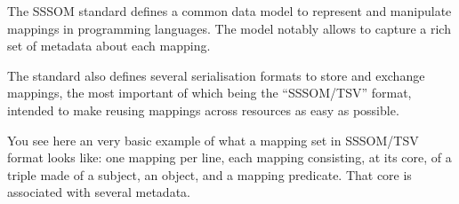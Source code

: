 \begin{frame}
{  The SSSOM standard defines a common data model to represent and manipulate
  mappings in programming languages. The model notably allows to capture a
  rich set of metadata about each mapping.

  The standard also defines several serialisation formats to store and
  exchange mappings, the most important of which being the ``SSSOM/TSV''
  format, intended to make reusing mappings across resources as easy as
  possible.

  You see here an very basic example of what a mapping set in SSSOM/TSV format
  looks like: one mapping per line, each mapping consisting, at its core, of a
  triple made of a subject, an object, and a mapping predicate. That core is
  associated with several metadata.}

\end{frame}

